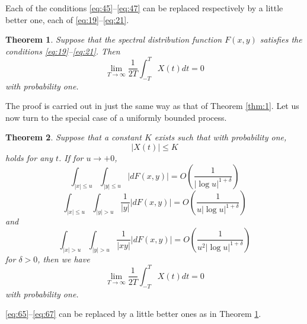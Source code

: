 \documentclass{article}
\newtheorem{theorem}{Theorem}
\begin{document}
Each of the conditions \eqref{eq:45}--\eqref{eq:47} can be replaced respectively by a little better one, each of \eqref{eq:19}--\eqref{eq:21}.

\begin{theorem}\label{thm:2}
Suppose that the spectral distribution function $F(x,y)$ satisfies the conditions \eqref{eq:19}--\eqref{eq:21}. Then
\begin{equation}\label{eq:63}
\lim_{T \rightarrow \infty} \frac{1}{2T} \int_{-T}^{T} X(t) dt=0
\end{equation}
with probability one.
\end{theorem}

The proof is carried out in just the same way as that of Theorem \ref{thm:1}. Let us now turn to the special case of a uniformly bounded process.

\begin{theorem}\label{thm:3}
Suppose that a constant $K$ exists such that with probability one,
\begin{equation}\label{eq:64}
|X(t)| \leq K
\end{equation}
holds for any $t$. If for $u \rightarrow+0$,
\begin{equation}\label{eq:65}
\int_{|x| \leq u} \int_{|y| \leq u}|dF(x,y)|=O\left(\frac{1}{|\log u|^{1+\delta}}\right)
\end{equation}
\begin{equation}\label{eq:66}
\int_{|x| \leq u} \int_{|y|>u} \frac{1}{|y|}|dF(x,y)|=O\left(\frac{1}{u|\log u|^{1+\delta}}\right)
\end{equation}
and
\begin{equation}\label{eq:67}
\int_{|x|>u} \int_{|y|>u} \frac{1}{|xy|}|dF(x,y)|=O\left(\frac{1}{u^{2}|\log u|^{1+\delta}}\right)
\end{equation}
for $\delta>0$, then we have
\begin{equation}\label{eq:68}
\lim_{T \rightarrow \infty} \frac{1}{2T} \int_{-T}^{T} X(t) dt=0
\end{equation}
with probability one.
\end{theorem}

\eqref{eq:65}--\eqref{eq:67} can be replaced by a little better ones as in Theorem \ref{thm:2}.
\end{document}
